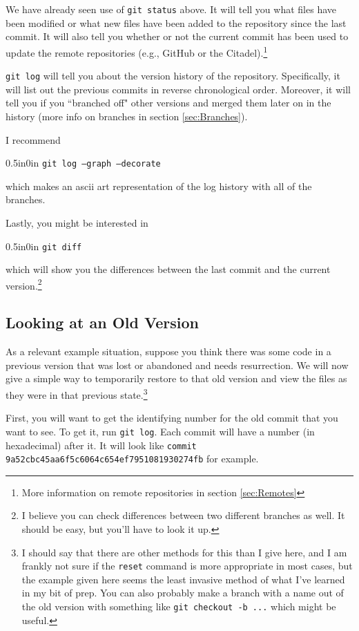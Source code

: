 \documentclass[11pt]{article}
\newcommand{\code}[1]{\begin{adjustwidth}{0.5in}{0in}
    \texttt{#1}
    \end{adjustwidth}}
\begin{document}
We have already seen use of \texttt{git status} above.  It will tell you what files have been modified or what new files have been added to the repository since the last commit.  It will also tell you whether or not the current commit has been used to update the remote repositories (e.g., GitHub or the Citadel).\footnote{More information on remote repositories in section \ref{sec:Remotes}}

\texttt{git log} will tell you about the version history of the repository.  Specifically, it will list out the previous commits in reverse chronological order.  Moreover, it will tell you if you ``branched off" other versions and merged them later on in the history (more info on branches in section \ref{sec:Branches}).  

I recommend 
\code{git log --graph --decorate} 
which makes an ascii art representation of the log history with all of the branches.
 
 Lastly, you might be interested in 
 
 \code{git diff}
 
 which will show you the differences between the last commit and the current version.\footnote{I believe you can check differences between two different branches as well.  It should be easy, but you'll have to look it up.}
 
 \subsection{Looking at an Old Version}
 
 As a relevant example situation, suppose you think there was some code in a previous version that was lost or abandoned and needs resurrection.  We will now give a simple way to temporarily restore to that old version and view the files as they were in that previous state.\footnote{I should say that there are other methods for this than I give here, and I am frankly not sure if the \texttt{reset} command is more appropriate in most cases, but the example given here seems the least invasive method of what I've learned in my bit of prep.  You can also probably make a branch with a name out of the old version with something like \texttt{git checkout -b ...} which might be useful.}

First, you will want to get the identifying number for the old commit that you want to see.  To get it, run \texttt{git log}.  Each commit will have a number (in hexadecimal) after it.  It will look like \texttt{commit 9a52cbc45aa6f5c6064c654ef7951081930274fb} for example.  
\end{document}
